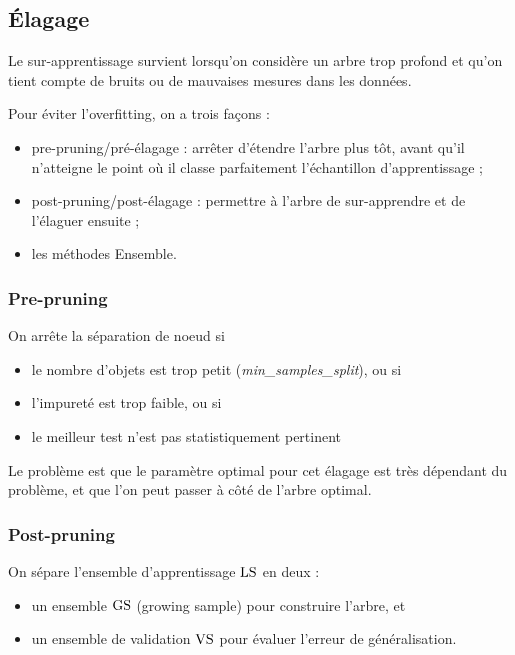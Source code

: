 			
	\subsection{Élagage}

	Le sur-apprentissage survient lorsqu'on considère un arbre trop profond et qu'on tient compte de bruits ou de mauvaises mesures dans les données.
	
	
	Pour éviter l'overfitting, on a trois façons :
	
	\begin{itemize}
		\item pre-pruning/pré-élagage : arrêter d'étendre l'arbre plus tôt, avant qu'il n'atteigne le point où il classe parfaitement l'échantillon d'apprentissage ;
		\item post-pruning/post-élagage : permettre à l'arbre de sur-apprendre et de l'élaguer ensuite ;
		\item les méthodes Ensemble.
	\end{itemize}
	
	
	
		\subsubsection{Pre-pruning}
		
		On arrête la séparation de noeud si
		
		\begin{itemize}
			\item le nombre d'objets est trop petit (\textit{min\_samples\_split}), ou si
			\item l'impureté est trop faible, ou si
			\item le meilleur test n'est pas statistiquement pertinent
		\end{itemize}
		
		Le problème est que le paramètre optimal pour cet élagage est très dépendant du problème, et que l'on peut passer à côté de l'arbre optimal.
		
		
		\subsubsection{Post-pruning}
		
		On sépare l'ensemble d'apprentissage $\text{LS}$ en deux :
		
		\begin{itemize}
			\item un ensemble $\text{GS}$ (growing sample) pour construire l'arbre, et
			\item un ensemble de validation $\text{VS}$ pour évaluer l'erreur de généralisation.
		\end{itemize}
		
